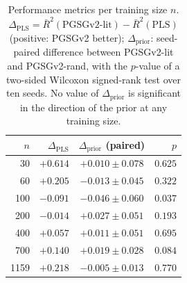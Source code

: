 \documentclass[preprint,12pt,hidelinks]{elsarticle}
\begin{document}
\begin{table}[htb]
  \centering
  \caption{Performance metrics per training size $n$.
           $\Delta_\mathrm{PLS} = \bar{R}^2(\text{PGSGv2-lit})
           - \bar{R}^2(\text{PLS})$ (positive: PGSGv2 better);
           $\Delta_\mathrm{prior}$: seed-paired difference between
           PGSGv2-lit and PGSGv2-rand, with the $p$-value of a two-sided
           Wilcoxon signed-rank test over ten seeds. No value of
           $\Delta_\mathrm{prior}$ is significant in the direction of the
           prior at any training size.}
  \label{tab:performance}
  \renewcommand{\arraystretch}{1.15}
  \begin{tabular}{r r c r}
    \toprule
    $n$ & $\Delta_\mathrm{PLS}$ & $\Delta_\mathrm{prior}$ (paired) & $p$ \\
    \midrule
      30 & $+0.614$ & $+0.010 \pm 0.078$ & $0.625$ \\
      60 & $+0.205$ & $-0.013 \pm 0.045$ & $0.322$ \\
     100 & $-0.091$ & $-0.046 \pm 0.060$ & $0.037$ \\
     200 & $-0.014$ & $+0.027 \pm 0.051$ & $0.193$ \\
     400 & $+0.057$ & $+0.011 \pm 0.051$ & $0.695$ \\
     700 & $+0.140$ & $+0.019 \pm 0.028$ & $0.084$ \\
    1159 & $+0.218$ & $-0.005 \pm 0.013$ & $0.770$ \\
    \bottomrule
  \end{tabular}
\end{table}
\end{document}
